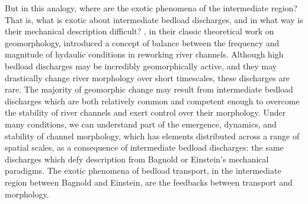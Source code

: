 \documentclass{article}
\begin{document}
But in this analogy, where are the exotic phenomena of the intermediate region? That is, what is exotic about intermediate bedload discharges, and in what way is their mechanical description difficult? 
\citet{Wolman1960}, in their classic theoretical work on geomorphology, introduced a concept of balance between the frequency and magnitude of hydaulic conditions in reworking river channels.  
Although high bedload discharges may be incredibly geomorphically active, and they may drastically change river morphology over short timescales, these discharges are rare. 
The majority of geomorphic change may result from intermediate bedload discharges which are both relatively common and competent enough to overcome the stability of river channels and exert control over their morphology. 
Under many conditions, we can understand part of the emergence, dynamics, and stability of channel morphology, which has elements distributed across a range of spatial scales, as a consequence of intermediate bedload discharges: the same discharges which defy description from Bagnold or Einstein's mechanical paradigms. 
The exotic phenomena of bedload transport, in the intermediate region between Bagnold and Einstein, are the feedbacks between transport and morphology.   
\end{document}
